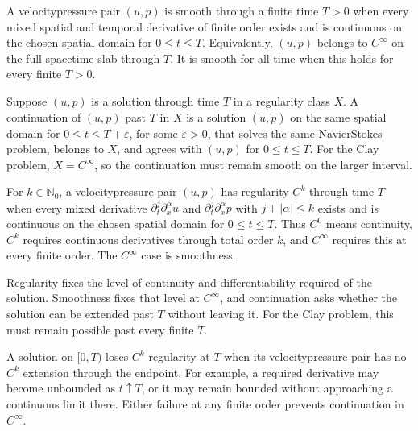 
\begin{definition}[Smoothness]\label{def:Smoothness}
A velocity\textendash pressure pair \((u,p)\) is smooth through a finite time \(T>0\) when every mixed spatial and temporal derivative of finite order exists and is continuous on the chosen spatial domain for \(0\leq t\leq T\).
Equivalently, \((u,p)\) belongs to \(C^\infty\) on the full space\textendash time slab through \(T\).
It is smooth for all time when this holds for every finite \(T>0\).
\end{definition}

\begin{definition}[Continuation]\label{def:Continuation}
Suppose \((u,p)\) is a solution through time \(T\) in a regularity class \(X\).
A continuation of \((u,p)\) past \(T\) in \(X\) is a solution \((\widetilde u,\widetilde p)\) on the same spatial domain for \(0\leq t\leq T+\varepsilon\), for some \(\varepsilon>0\), that solves the same Navier\textendash Stokes problem, belongs to \(X\), and agrees with \((u,p)\) for \(0\leq t\leq T\).
For the Clay problem, \(X=C^\infty\), so the continuation must remain smooth on the larger interval.
\end{definition}

\begin{definition}[Regularity]\label{def:Regularity}
For \(k\in\mathbb N_0\), a velocity\textendash pressure pair \((u,p)\) has regularity \(C^k\) through time \(T\) when every mixed derivative \(\partial_t^j\partial_x^\alpha u\) and \(\partial_t^j\partial_x^\alpha p\) with \(j+\lvert\alpha\rvert\leq k\) exists and is continuous on the chosen spatial domain for \(0\leq t\leq T\).
Thus \(C^0\) means continuity, \(C^k\) requires continuous derivatives through total order \(k\), and \(C^\infty\) requires this at every finite order.
The \(C^\infty\) case is smoothness.
\end{definition}

Regularity fixes the level of continuity and differentiability required of the solution.
Smoothness fixes that level at \(C^\infty\), and continuation asks whether the solution can be extended past \(T\) without leaving it.
For the Clay problem, this must remain possible past every finite \(T\).

A solution on \([0,T)\) loses \(C^k\) regularity at \(T\) when its velocity\textendash pressure pair has no \(C^k\) extension through the endpoint.
For example, a required derivative may become unbounded as \(t\uparrow T\), or it may remain bounded without approaching a continuous limit there.
Either failure at any finite order prevents continuation in \(C^\infty\).
